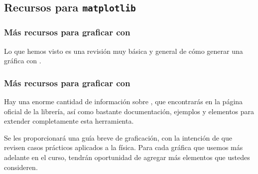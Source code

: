 \subsection{Recursos para \texttt{matplotlib}}
\begin{frame}
\frametitle{Más recursos para graficar con \python}
Lo que hemos visto es una revisión muy básica y general de cómo generar una gráfica con \python.
\end{frame}
\begin{frame}
\frametitle{Más recursos para graficar con \python}
Hay una enorme cantidad de información sobre , que encontrarás en la página oficial de la librería, así como bastante documentación, ejemplos y elementos para extender completamente esta herramienta.
\end{frame}
\begin{frame}
Se les proporcionará una guía breve de graficación, con la intención de que revisen casos prácticos aplicados a la física. Para cada gráfica que usemos más adelante en el curso, tendrán oportunidad de agregar más elementos que ustedes consideren.
\end{frame}
